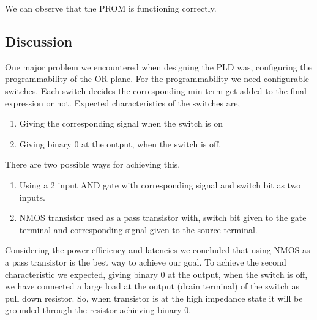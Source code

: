 \documentclass[a4paper,11pt]{article}%
\begin{document}
We can observe that the PROM is functioning correctly.

\subsection{Discussion}


One major problem we encountered when designing the PLD was, configuring the programmability of the OR plane. For the programmability we need configurable switches. Each switch decides the corresponding min-term get added to the final expression or not. Expected characteristics of the switches are,
\begin{enumerate}[\hspace{1cm}1.]
	\item Giving the corresponding signal when the switch is on
	\item Giving binary 0 at the output, when the switch is off.
	
\end{enumerate}
There are two possible ways for achieving this.
\begin{enumerate}[\hspace{1cm}1.]
	\item Using a 2 input AND gate with corresponding signal and switch bit as two inputs.
	\item NMOS transistor used as a pass transistor with, switch bit given to the gate terminal and corresponding signal given to the source terminal.
	
\end{enumerate}
Considering the power efficiency and latencies we concluded that using NMOS as a pass transistor is the best way to achieve our goal.
To achieve the second characteristic we expected, giving binary 0 at the output, when the switch is off, we have connected a large load at the output (drain terminal) of the switch as pull
down resistor. So, when transistor is at the high impedance state it will be grounded through the resistor achieving binary 0.

%
%
\end{document}
